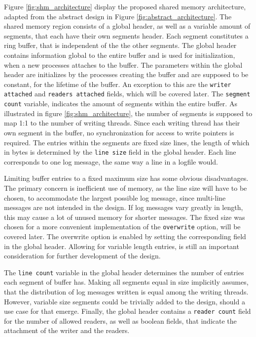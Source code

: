 Figure \ref{fig:shm_architecture} display the proposed shared memory architecture, adapted from the abstract design in Figure \ref{fig:abstract_architecture}.
The shared memory region consists of a global header, as well as a variable amount of segments,
that each have their own segments header. Each segment constitutes a ring buffer, that is independent of the
the other segments. The global header contains information global to
the entire buffer and is used for initialization, when a new processes attaches to the buffer. The parameters within the global
header are initializes by the processes creating the buffer and are supposed to be constant, for the lifetime of the buffer. An exception to this 
are the \texttt{writer attached} and \texttt{readers attached} fields, which will be covered later.
The \texttt{segment count} variable, indicates the amount of segments within the entire buffer. As illustrated
in figure \ref{fig:shm_architecture}, the number of segments is supposed to map 1:1 to the number 
of writing threads. Since each writing thread has their own segment in the buffer, no synchronization for access
to write pointers is required. The entries within the segments are fixed
size lines, the length of which in bytes is determined by the \texttt{line size} field in the global header. Each line corresponds
to one log message, the same way a line in a logfile would. 
\par 
Limiting buffer entries to a fixed maximum size has some obvious disadvantages. The primary concern
is inefficient use of memory, as the line size will have to be chosen, to accommodate the largest possible log message, since multi-line
messages are not intended in the design. If log messages vary greatly in length, this may cause a lot of unused memory
for shorter messages. The fixed size was chosen for a more convenient implementation of the \texttt{overwrite} option, will be covered later. The overwrite option is enabled by setting the corresponding field in the global header. 
Allowing for variable length entries, is still an important consideration for further development of the design.
\par
The \texttt{line count} variable in the global header 
determines the number of entries each segment of buffer has. Making all segments equal in size implicitly assumes, that the distribution of log messages written
is equal among the writing threads. However, variable size segments could be trivially added to the design, should a use case for that emerge. 
Finally, the global header contains a \texttt{reader count} field for the number of allowed readers, as well as boolean fields, that indicate the attachment of the writer and the readers.
